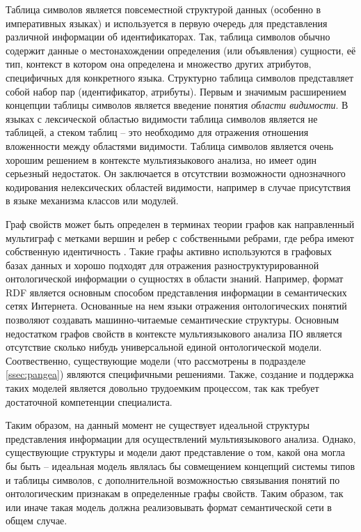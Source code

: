Таблица символов является повсеместной структурой данных (особенно в императивных языках) и
используется в первую очередь для представления различной информации об идентификаторах. Так,
таблица символов обычно содержит данные о местонахождении определения (или объявления) сущности,
её тип, контекст в котором она определена и множество других атрибутов, специфичных для конкретного
языка. Структурно таблица символов представляет собой набор пар (идентификатор, атрибуты).
Первым и значимым расширением концепции таблицы символов является введение понятия \textit{области видимости}.
В языках с лексической областью видимости таблица символов является не таблицей, а стеком таблиц --
это необходимо для отражения отношения вложенности между областями видимости. Таблица символов
является очень хорошим решением в контексте мультиязыкового анализа, но имеет один серьезный недостаток.
Он заключается в отсутствии возможности однозначного кодирования нелексических
областей видимости, например в случае присутствия в языке механизма классов или модулей.

Граф свойств может быть определен в терминах теории графов как направленный 
мультиграф с метками вершин и ребер с собственными ребрами, 
где ребра имеют собственную идентичность \cite{property-graph}.
Такие графы активно используются в графовых базах данных и хорошо подходят для отражения
разноструктурированной онтологической информации о сущностях в области знаний.
Например, формат RDF \cite{RDF} является основным способом представления информации
в семантических сетях Интернета. Основанные на нем языки отражения онтологических
понятий позволяют создавать машинно-читаемые семантические структуры.
Основным недостатком графов свойств в контексте мультиязыкового анализа ПО является отсутствие
сколько нибудь универсальной единой онтологической модели. Соотвественно, существующие
модели (что рассмотрены в подразделе \ref{ssec:pangea}) являются специфичными решениями.
Также, создание и поддержка таких моделей является довольно трудоемким процессом, так как требует
достаточной компетенции специалиста.

Таким образом, на данный момент не существует идеальной структуры представления информации
для осуществлений мультиязыкового анализа. Однако, существующие структуры и модели дают
представление о том, какой она могла бы быть -- идеальная модель являлась бы совмещением
концепций системы типов и таблицы символов, с дополнительной возможностью связывания
понятий по онтологическим признакам в определенные графы свойств. Таким образом, так или иначе
такая модель должна реализовывать формат семантической сети в общем случае.

